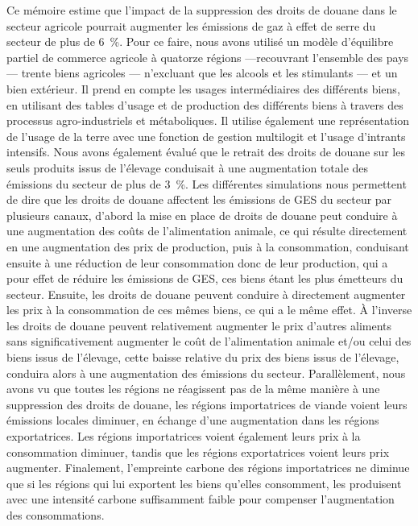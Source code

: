 Ce mémoire estime que l'impact de la suppression des droits de douane dans le secteur agricole pourrait augmenter les émissions de gaz à effet de serre du secteur de plus de 6~\%. Pour ce faire, nous avons utilisé un modèle d'équilibre partiel de commerce agricole à quatorze régions  —recouvrant l'ensemble des pays — trente biens agricoles — n'excluant que les alcools et les stimulants — et un bien extérieur. Il prend en compte les usages intermédiaires des différents biens, en utilisant des tables d'usage et de production des différents biens à travers des processus agro-industriels et métaboliques. Il utilise également une représentation de l'usage de la terre avec une fonction de gestion multilogit et l'usage d'intrants intensifs. Nous avons également évalué que le retrait des droits de douane sur les seuls produits issus de l'élevage conduisait à une augmentation totale des émissions du secteur de plus de 3~\%. Les différentes simulations nous permettent de dire que les droits de douane affectent les émissions de GES du secteur par plusieurs canaux, d'abord la mise en place de droits de douane peut conduire à une augmentation des coûts de l'alimentation animale, ce qui résulte directement en une augmentation des prix de production, puis à la consommation, conduisant ensuite à une réduction de leur consommation donc de leur production, qui a pour effet de réduire les émissions de GES, ces biens étant les plus émetteurs du secteur. Ensuite, les droits de douane peuvent conduire à directement augmenter les prix à la consommation de ces mêmes biens, ce qui a le même effet. À l'inverse les droits de douane peuvent relativement augmenter le prix d'autres aliments sans significativement augmenter le coût de l'alimentation animale et/ou celui des biens issus de l'élevage, cette baisse relative du prix des biens issus de l'élevage, conduira alors à une augmentation des émissions du secteur. Parallèlement, nous avons vu que toutes les régions ne réagissent pas de la même manière à une suppression des droits de douane, les régions importatrices de viande voient leurs émissions locales diminuer, en échange d'une augmentation dans les régions exportatrices. Les régions importatrices voient également leurs prix à la consommation diminuer, tandis que les régions exportatrices voient leurs prix augmenter. Finalement, l'empreinte carbone des régions importatrices ne diminue que si les régions qui lui exportent les biens qu'elles consomment, les produisent avec une intensité carbone suffisamment faible pour compenser l'augmentation des consommations.

